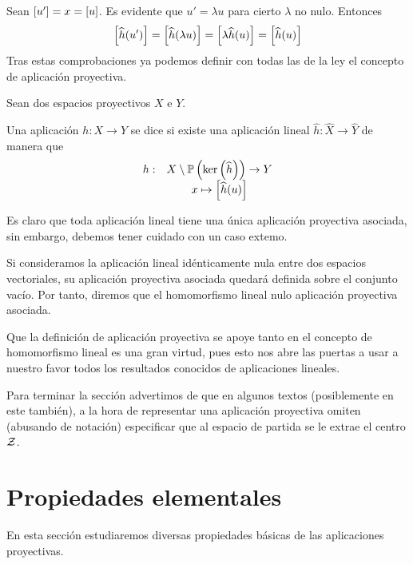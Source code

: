 Sean $\left [ u' \right ]=x=\left [ u \right ]$. Es evidente que $u' = \lambda u$ para cierto $\lambda$ no nulo. Entonces
\begin{equation*}
	\left [ \widehat{h}(u') \right ]=\left [ \widehat{h}(\lambda u) \right ]=\left [ \lambda\widehat{h}(u) \right ]=\left [ \widehat{h}(u) \right ]
\end{equation*}
Tras estas comprobaciones ya podemos definir con todas las de la ley el concepto de aplicación proyectiva.
\begin{defi}
	Sean dos espacios proyectivos $X$ e $Y$.
	
	Una aplicación $h:X\to Y$ se dice  si existe una aplicación lineal $\widehat{h}:\widehat{X}\to\widehat{Y}$ de manera que
	\begin{equation*}
		\begin{array}{cc}
		h:&X\setminus\mathbb{P}\left(\ker\left(\widehat{h}\right)\right)\to Y\\
		&x\mapsto\left [ \widehat{h}(u) \right ]
		\end{array}
	\end{equation*}
\end{defi}
Es claro que toda aplicación lineal tiene una única aplicación proyectiva asociada, sin embargo, debemos tener cuidado con un caso extemo.
\begin{obs}
	Si consideramos la aplicación lineal idénticamente nula entre dos espacios vectoriales, su aplicación proyectiva asociada quedará definida sobre el conjunto vacío. Por tanto, diremos que el homomorfismo lineal nulo  aplicación proyectiva asociada.
\end{obs}
Que la definición de aplicación proyectiva se apoye tanto en el concepto de homomorfismo lineal es una gran virtud, pues esto nos abre las puertas a usar a nuestro favor todos los resultados conocidos de aplicaciones lineales.

Para terminar la sección advertimos de que en algunos textos (posiblemente en este también), a la hora de representar una aplicación proyectiva omiten (abusando de notación) especificar que al espacio de partida se le extrae el centro $\mathcal{Z}$. 
\section{Propiedades elementales}
\label{apro_propiedadesElementales}
En esta sección estudiaremos diversas propiedades básicas de las aplicaciones proyectivas.


